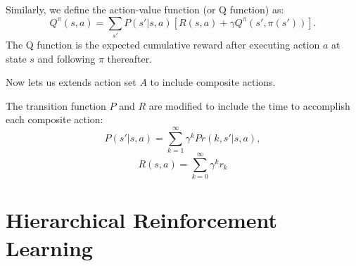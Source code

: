 Similarly, we define the action-value function (or Q function) as:
\begin{equation}
    Q^{\pi}(s, a) = \sum_{s'}P(s'|s, a)[R(s, a) + \gamma Q^{\pi}(s', \pi(s'))].
    \label{eq:Q}
\end{equation}
The Q function is the expected cumulative reward after executing action $a$ at state $s$ and following
$\pi$ thereafter.

Now lets us extends action set $A$ to include composite actions.


The transition function $P$ and $R$ are modified to include the time to accomplish each composite action:
\begin{equation}
    P(s'|s, a) = \sum^{\infty}_{k=1} \gamma^k Pr(k, s'|s, a),
    \label{eq:multiProb}
\end{equation}
\begin{equation}
    R(s, a) = \sum^{\infty}_{k=0} \gamma^k r_k
\end{equation}



\section{Hierarchical Reinforcement Learning}


